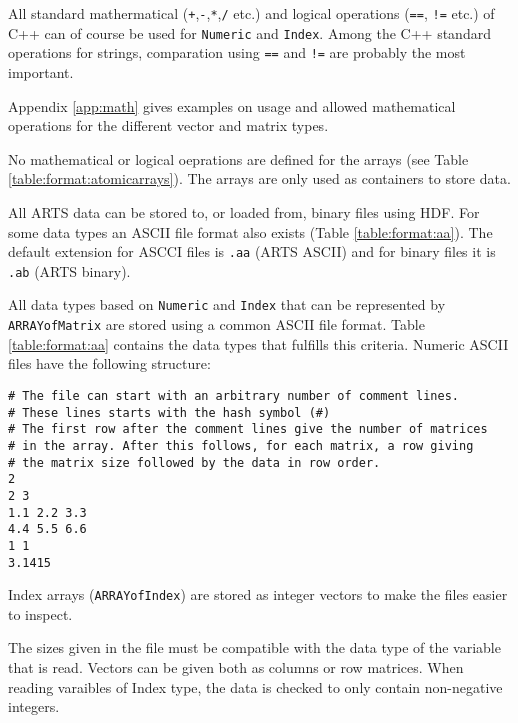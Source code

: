  All standard mathermatical (\verb|+|,\verb|-|,\verb|*|,\verb|/| etc.)
 and logical operations (\verb|==|, \verb|!=| etc.) of C++ can of
 course be used for \verb|Numeric| and \verb|Index|. Among the C++
 standard operations for strings, comparation using \verb|==| and
 \verb|!=| are probably the most important.

 
 
 Appendix \ref{app:math} gives examples on usage and allowed
 mathematical operations for the different vector and matrix types.
 
 No mathematical or logical oeprations are defined for the arrays (see
 Table \ref{table:format:atomicarrays}). The arrays are only used as
 containers to store data.


 \label{sec:formats:files}
 
 All ARTS data can be stored to, or loaded from, binary files using
 HDF.  For some data types an ASCII file format also exists (Table
 \ref{table:format:aa}). The default extension for ASCCI files is
 \verb|.aa| (ARTS ASCII) and for binary files it is \verb|.ab| (ARTS
 binary).
 
  \label{sec:formats:file:ascii}
  
  All data types based on \verb|Numeric| and \verb|Index| that can be
  represented by \verb|ARRAYofMatrix| are stored using a common ASCII
  file format. Table \ref{table:format:aa} contains the data types that
  fulfills this criteria. Numeric ASCII files have the following 
  structure: \\
  {\footnotesize \begin{verbatim} 
# The file can start with an arbitrary number of comment lines.  
# These lines starts with the hash symbol (#) 
# The first row after the comment lines give the number of matrices 
# in the array. After this follows, for each matrix, a row giving 
# the matrix size followed by the data in row order.  
2 
2 3 
1.1 2.2 3.3 
4.4 5.5 6.6 
1 1 
3.1415
 \end{verbatim} 
}

 \noindent
 Index arrays (\verb|ARRAYofIndex|) are stored as integer vectors to
 make the files easier to inspect.
     
 The sizes given in the file must be compatible with the data type
 of the variable that is read. Vectors can be given both as
 columns or row matrices. When reading varaibles of Index type,
 the data is checked to only contain non-negative integers.
 
